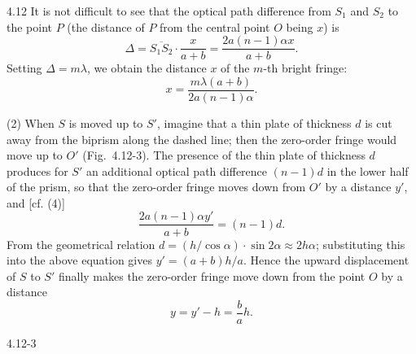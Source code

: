 \begin{solution}{4.12}
It is not difficult to see that the optical path difference from $S_1$ and $S_2$ to the point $P$
(the distance of $P$ from the central point $O$ being $x$) is
\begin{equation}
\Delta = \overline{S_1S_2}\cdot\frac{x}{a+b} = \frac{2a(n-1)\alpha x}{a+b}. \tag{4}
\end{equation}
Setting $\Delta=m\lambda$, we obtain the distance $x$ of the $m$-th bright fringe:
\begin{equation*}
x = \frac{m\lambda(a+b)}{2a(n-1)\alpha}.
\end{equation*}

(2) When $S$ is moved up to $S'$, imagine that a thin plate of thickness $d$ is cut away from the
biprism along the dashed line; then the zero-order fringe would move up to $O'$ (Fig.~4.12-3). The
presence of the thin plate of thickness $d$ produces for $S'$ an additional optical path difference
$(n-1)d$ in the lower half of the prism, so that the zero-order fringe moves down from $O'$ by a
distance $y'$, and [cf. (4)]
\begin{equation*}
\frac{2a(n-1)\alpha y'}{a+b} = (n-1)d.
\end{equation*}
From the geometrical relation $d=(h/\cos\alpha)\cdot\sin 2\alpha\approx 2h\alpha$; substituting this
into the above equation gives $y'=(a+b)h/a$. Hence the upward displacement of $S$ to $S'$ finally
makes the zero-order fringe move down from the point $O$ by a distance
\begin{equation*}
y = y'-h = \frac{b}{a}h.
\end{equation*}

\begin{figbox}{4.12-3}
\end{figbox}


\end{solution}
